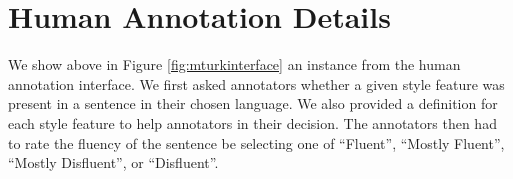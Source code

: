 \section{Human Annotation Details}

\mturkinterfacefig

\datasetevaltable %

\label{sec:appendix:humanannotation}


We show above in Figure \ref{fig:mturkinterface} an instance from the human annotation interface. We first asked annotators whether a given style feature was present in a sentence in their chosen language. We also provided a definition for each style feature to help annotators in their decision. The annotators then had to rate the fluency of the sentence be selecting one of ``Fluent'', ``Mostly Fluent'', ``Mostly Disfluent'', or ``Disfluent''. %




